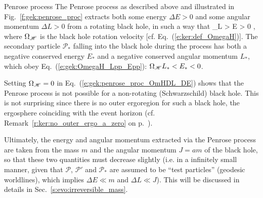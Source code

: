 \begin{tprop}{Penrose process}{}
The Penrose process as described above and illustrated in Fig.~\ref{f:gek:penrose_proc}
extracts both some energy $\Delta E > 0$  and some angular momentum $\Delta L > 0$ from
a rotating black hole, in such a way that
\be \label{e:gek:penrose_proc_OmHDL_DE}
    \Omega_{\Hor}\Delta L > \Delta E > 0 ,
\ee
where $\Omega_{\mathscr{H}}$ is the black hole rotation velocity [cf. Eq.~(\ref{e:ker:def_OmegaH})].
The secondary particle $\mathscr{P}_*$ falling into the black hole during the
process has both a negative conserved energy $E_*$ and a negative conserved angular
momentum $L_*$, which obey Eq.~(\ref{e:gek:OmegaH_Lpp_Epp}):
$\Omega_{\mathscr{H}} L_* < E_* < 0$.
\end{tprop}

\begin{remark}
Setting $\Omega_{\mathscr{H}} = 0$ in Eq.~(\ref{e:gek:penrose_proc_OmHDL_DE}) shows
that the Penrose process is not possible for a non-rotating (Schwarzschild) black hole.
This is not surprising since there is no outer ergoregion for such a black hole, the
ergosphere coinciding with the event horizon (cf. Remark~\ref{r:ker:no_outer_ergo_a_zero} on
p.~\pageref{r:ker:no_outer_ergo_a_zero}).
\end{remark}

Ultimately, the energy and angular momentum extracted via the Penrose process
are taken from the mass $m$ and the angular momentum $J = am$
of the black hole, so that these two quantities must decrease slightly
(i.e. in a infinitely small manner, given that $\mathscr{P}$, $\mathscr{P}'$
and $\mathscr{P}_*$ are assumed to be ``test particles'' (geodesic worldlines),
which implies $\Delta E \ll m$ and $\Delta L \ll J$).
This will be discussed in details in Sec.~\ref{s:evo:irreversible_mass}.

